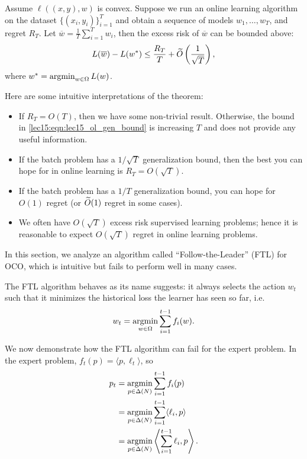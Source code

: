 \begin{theorem}
Assume $\ell((x, y), w)$ is convex. Suppose we run an online learning algorithm on the dataset $\{(x_i, y_i)\}_{i=1}^T$ and obtain a sequence of models $w_1, \dots, w_T$, and regret $R_T$. Let $\overline{w} = \frac{1}{T} \sum_{i=1}^T w_i$, then the excess risk of $\overline{w}$ can be bounded above:
\begin{align}
L(\overline{w}) - L(w^*) \leq \frac{R_T}{T} + \widetilde{O}\left(\frac{1}{\sqrt{T}}\right), \label{lec15:eqn:lec15_ol_gen_bound}
\end{align}
where $w^* = \operatorname*{\textup{argmin}}_{w \in \Omega} L(w)$.
\end{theorem}

Here are some intuitive interpretations of the theorem:

    \begin{itemize}
        \item If $R_T = O(T)$, then we have some non-trivial result. Otherwise, the bound in \eqref{lec15:eqn:lec15_ol_gen_bound} is increasing $T$ and does not provide any useful information.
        \item If the batch problem has a $1 / \sqrt{T}$ generalization bound, then the best you can hope for in online learning is $R_T = O(\sqrt{T})$.
        \item If the batch problem has a $1 / T$ generalization bound, you can hope for $O(1)$ regret (or $\widetilde{O}(1)$ regret in some cases).
        \item We often have $O(\sqrt{T})$ excess risk supervised learning problems; hence it is reasonable to expect $O(\sqrt{T})$ regret in online learning problems.
    \end{itemize}
    
 \label{lec15:sec:FTL}
In this section, we analyze an algorithm called ``Follow-the-Leader'' (FTL) for OCO, which is intuitive but fails to perform well in many cases.

The FTL algorithm behaves as its name suggests: it always selects the action $w_t$ such that it minimizes the historical loss the learner has seen so far, i.e.
\begin{equation}
w_t = \operatorname*{\textup{argmin}}_{w \in \Omega} \sum_{i=1}^{t-1} f_i(w).
\end{equation}

We now demonstrate how the FTL algorithm can fail for the expert problem. In the expert problem, $f_t(p) = \langle p, \ell_t \rangle$, so 
    \begin{align}
        p_t &= \operatorname*{\textup{argmin}}_{p \in \Delta(N)} \sum_{i=1}^{t-1} f_i(p) \\
        &= \operatorname*{\textup{argmin}}_{p \in \Delta(N)} \sum_{i=1}^{t-1} \langle\ell_i, p\rangle \\
        &= \operatorname*{\textup{argmin}}_{p \in \Delta(N)} \left\langle\sum_{i=1}^{t-1}\ell_i, p\right\rangle.
    \end{align}

